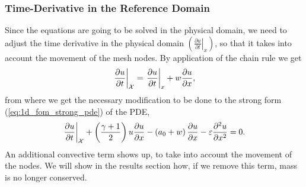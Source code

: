 \documentclass[../../thesis.tex]{subfiles}
\newcommand{\aleX}{\ensuremath{\mathcal{X}}}
\begin{document}
\subsubsection*{Time-Derivative in the Reference Domain}
Since the equations are going to be solved in the physical domain, we need to adjust the time derivative in the physical domain 
$\left(\left.\frac{\partial u}{\partial t}\right|_{x}\right)$, 
so that it takes into account the movement of the mesh nodes.
By application of the chain rule we get
\begin{equation}
    \left.\frac{\partial u}{\partial t}\right|_{\aleX} = 
    \left.\frac{\partial u}{\partial t}\right|_{x} + w \pdv{u}{x},
\end{equation}
from where we get the necessary modification to be done to the strong form (\ref{eq:1d_fom_strong_pde}) of the PDE, 
\begin{equation}
    \left.\frac{\partial u}{\partial t}\right|_{\aleX} 
    + \left(\frac{\gamma+1}{2}\right) u \frac{\partial u}{\partial x} 
    - \left(a_0 + w\right)\frac{\partial u}{\partial x} 
    - \varepsilon \pdv[2]{u}{x} = 0.
\end{equation}
An additional convective term shows up, to take into account the movement of the nodes.
We will show in the results section how, if we remove this term, mass is no longer conserved.

\end{document}
